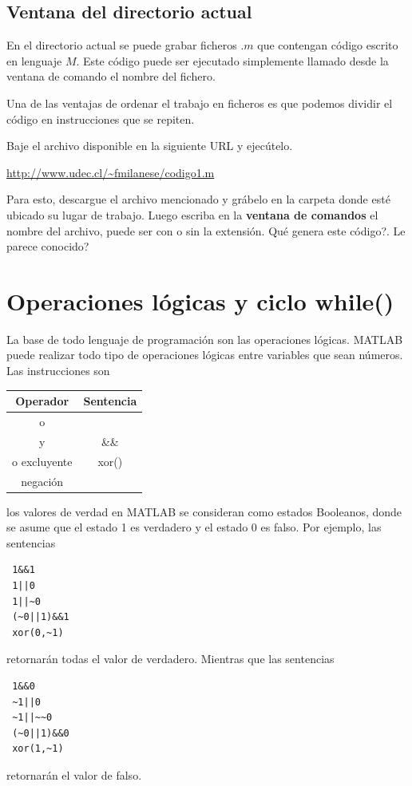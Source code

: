 \documentclass[11pt]{article}
\begin{document}
\subsection{Ventana del directorio actual}
  En el directorio actual se puede grabar ficheros $.m$ que contengan c\'odigo escrito 
  en lenguaje $M$. Este c\'odigo puede ser ejecutado simplemente llamado desde 
  la ventana de comando el nombre del fichero.
  
  Una de las ventajas de ordenar el trabajo en ficheros es que podemos dividir el c\'odigo en instrucciones que se repiten.
  
Baje el archivo disponible en la siguiente URL y ejec\'utelo. \begin{center}
\url{http://www.udec.cl/~fmilanese/codigo1.m}
\end{center} Para esto, descargue el archivo mencionado y gr\'abelo en la carpeta donde   est\'e ubicado su lugar de trabajo. Luego escriba en la \textbf{ventana de comandos} el  nombre del archivo, puede ser con o sin la extensi\'on. 
  \textquestiondown Qu\'e genera este c\'odigo?. \textquestiondown Le parece conocido?

%
\section{Operaciones l\'ogicas y ciclo while()}
La base de todo lenguaje de programaci\'on son las operaciones l\'ogicas. MATLAB puede realizar todo tipo de operaciones 
l\'ogicas entre variables que sean n\'umeros. Las instrucciones son
\begin{center}
  \begin{tabular}{c|c}
  \hline
  Operador 		& Sentencia \\
  \hline
    o				&  \textbar\textbar \\
    y				& 	\&\&\\	
    o excluyente	& xor()\\
    negaci\'on		& \texttildelow
  \end{tabular}
\end{center}
los valores de verdad en MATLAB se consideran como estados Booleanos, donde se asume que el estado 1 es verdadero 
y el estado 0 es falso. Por ejemplo, las sentencias
\begin{verbatim}
 1&&1
 1||0
 1||~0
 (~0||1)&&1
 xor(0,~1)
\end{verbatim}
retornar\'an todas el valor de verdadero. Mientras que las sentencias
\begin{verbatim}
 1&&0
 ~1||0
 ~1||~~0
 (~0||1)&&0
 xor(1,~1)
\end{verbatim}
retornar\'an el valor de falso.
\end{document}
